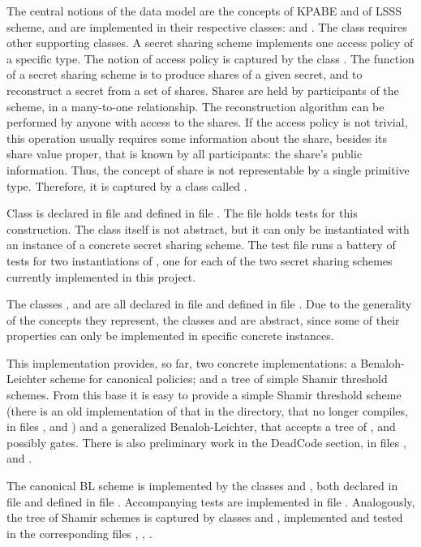 \documentclass{article}
\begin{document}
The central notions of the data model are the concepts of KPABE and of LSSS scheme, and are implemented in their respective classes: \cKPABE and \cSS. The class \cSS requires other supporting classes. A secret sharing scheme implements one access policy of a specific type. The notion of access policy is captured by the class \cAP. The function of a secret sharing scheme is to produce shares of a given secret, and to reconstruct a secret from a set of shares. Shares are held by participants of the scheme, in a many-to-one relationship. The reconstruction algorithm can be performed by anyone with access to the shares. If the access policy is not trivial, this operation usually requires some information about the share, besides its share value proper, that is known by all participants: the share's public information. Thus, the concept of share is not representable by a single primitive type. Therefore, it is captured by a class called \cST.

Class \fckpabe is declared in file \fhkpabe and defined in file \fckpabe. The file \ftkpabe holds tests for this construction. The class \cKPABE itself is not abstract, but it can only be instantiated with an instance of a concrete secret sharing scheme. The test file runs a battery of tests for two instantiations of \cKPABE, one for each of the two secret sharing schemes currently implemented in this project.

The classes \cST, \cAP and \cSS are all declared in file \fhss and defined in file \fcss. Due to the generality of the concepts they represent, the classes \cSS and \cAP are abstract, since some of their properties can only be implemented in specific concrete instances.

This implementation provides, so far, two concrete implementations: a Benaloh-Leichter scheme for canonical policies; and a tree of simple Shamir threshold schemes. From this base it is easy to provide a simple Shamir threshold scheme (there is an old implementation of that in the  directory, that no longer compiles, in files ,  and ) and a generalized Benaloh-Leichter, that accepts a tree of ,  and possibly  gates. There is also preliminary work in the DeadCode section, in files ,  and .

The canonical BL scheme is implemented by the classes \cBLcanon and \cBLcanonAP, both declared in file \fhblcanon and defined in file \fcblcanon.
Accompanying tests are implemented in file \ftblcanon. Analogously, the tree of Shamir schemes is captured by classes \cShTree and \cShTreeAP, implemented and tested in the corresponding files \fhshtree, \fcshtree, \ftshtree.
\end{document}
